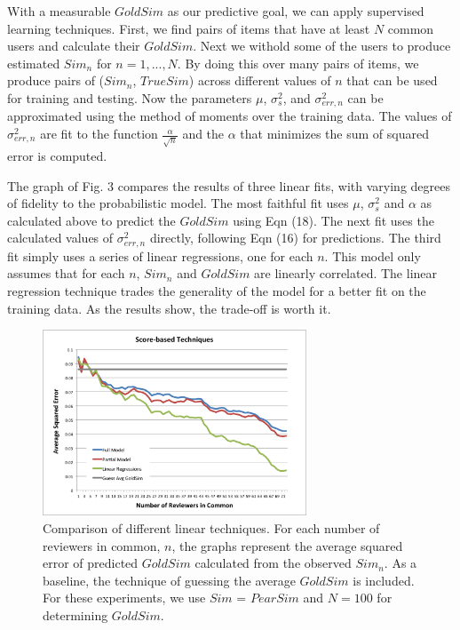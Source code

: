 \documentclass[11pt]{article}
\begin{document}
With a measurable $GoldSim$ as our predictive goal, we can apply supervised 
learning techniques. First, we find pairs of items that have at least $N$ common
users and calculate their $GoldSim$. Next we withold some of the users to 
produce estimated $Sim_n$ for $n=1,...,N$. By doing this over many pairs of 
items, we produce pairs of ($Sim_n$, $TrueSim$) across different values of $n$ 
that can be used for training and testing. Now the parameters $\mu$, 
$\sigma_{s}^2$, and $\sigma_{err,n}^2$ can be approximated using the method of 
moments over the training data. The values of $\sigma_{err,n}^2$ are fit to the 
function $\frac{\alpha}{\sqrt{n}}$ and the $\alpha$ that minimizes the sum of 
squared error is computed.

The graph of Fig. 3 compares the results of three linear fits, with varying
degrees of fidelity to the probabilistic model. The most faithful fit uses
$\mu$, $\sigma_{s}^2$ and $\alpha$ as calculated above to predict the $GoldSim$
using Eqn (18). The next fit uses the calculated values of $\sigma_{err,n}^2$ directly,
following Eqn (16) for predictions. The third fit simply uses a series of linear
regressions, one for each $n$. This model only assumes that for each $n$,
$Sim_n$ and $GoldSim$ are linearly correlated. The linear regression technique 
trades the generality of the model for a better fit on the training data. 
As the results show, the trade-off is worth it.

\begin{figure}[!htbp]
    \centering
    \includegraphics[width=0.7\textwidth]{LinearTechniques.png}
	\caption{Comparison of different linear techniques. For each number of reviewers
    in common, $n$, the graphs represent the average squared error of predicted
    $GoldSim$ calculated from the observed $Sim_n$. As a baseline, the technique
    of guessing the average $GoldSim$ is included. For these experiments, we use
    $Sim$ = $PearSim$ and $N=100$ for determining $GoldSim$.}
    \label{fig:Linear}
\end{figure}
\end{document}
